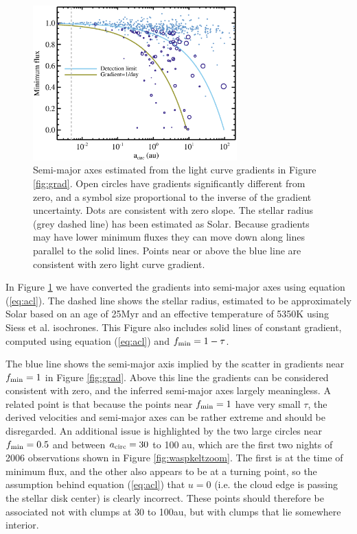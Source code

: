 \documentclass[]{rsos}
\begin{document}
\begin{figure}
  \begin{center}
    \hspace{-0.5cm} \includegraphics[width=0.7\textwidth]{figs/sma.eps}
    \caption{Semi-major axes estimated from the light curve gradients in Figure
      \ref{fig:grad}. Open circles have gradients significantly different from zero, and
      a symbol size proportional to the inverse of the gradient uncertainty. Dots are
      consistent with zero slope. The stellar radius (grey dashed line) has been
      estimated as Solar. Because gradients may have lower minimum fluxes they can move
      down along lines parallel to the solid lines. Points near or above the blue line
      are consistent with zero light curve gradient.}\label{fig:sma}
  \end{center}
\end{figure}

In Figure \ref{fig:sma} we have converted the gradients into semi-major axes using
equation (\ref{eq:acl}). The dashed line shows the stellar radius, estimated to be
approximately Solar based on an age of 25Myr \cite{2013AstL...39..776P} and an effective
temperature of 5350K \cite{2014A&A...563A.139P} using Siess et
al. \cite{2000A&A...358..593S} isochrones. This Figure also includes solid lines of
constant gradient, computed using equation (\ref{eq:acl}) and $f_{\rm min} = 1-\tau$.

The blue line shows the semi-major axis implied by the scatter in gradients near
$f_{\rm min}=1$ in Figure \ref{fig:grad}. Above this line the gradients can be considered
consistent with zero, and the inferred semi-major axes largely meaningless. A related
point is that because the points near $f_{\rm min}=1$ have very small $\tau$, the derived
velocities and semi-major axes can be rather extreme and should be disregarded. An
additional issue is highlighted by the two large circles near $f_{\rm min}=0.5$ and
between $a_{\rm circ}=30$ to 100 au, which are the first two nights of 2006 observations
shown in Figure \ref{fig:waspkeltzoom}. The first is at the time of minimum flux, and the
other also appears to be at a turning point, so the assumption behind equation
(\ref{eq:acl}) that $u=0$ (i.e. the cloud edge is passing the stellar disk center) is
clearly incorrect. These points should therefore be associated not with clumps at 30 to
100au, but with clumps that lie somewhere interior.
\end{document}
